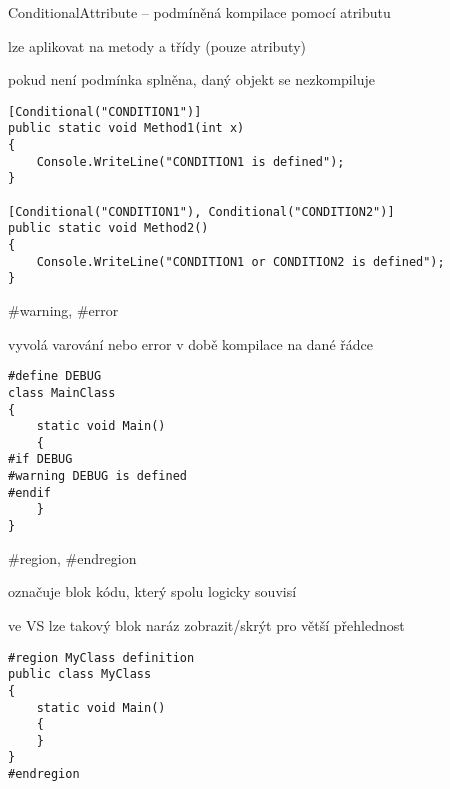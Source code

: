 \begin{frame}[fragile]
\vfill
\begin{bitemize}{ConditionalAttribute -- podmíněná kompilace pomocí atributu}
\item lze aplikovat na metody a třídy (pouze atributy)
\item pokud není podmínka splněna, daný objekt se nezkompiluje
\end{bitemize}
\vfill
\begin{yesblock}
\begin{lstlisting}
[Conditional("CONDITION1")]
public static void Method1(int x)
{
    Console.WriteLine("CONDITION1 is defined");
}

[Conditional("CONDITION1"), Conditional("CONDITION2")]  
public static void Method2()
{
    Console.WriteLine("CONDITION1 or CONDITION2 is defined");
}
\end{lstlisting}
\end{yesblock}
\vfill
\end{frame}



\begin{frame}[fragile]
\vfill
\begin{bitemize}{\#warning, \#error}
\item vyvolá varování nebo error v době kompilace na dané řádce
\end{bitemize}
\vfill
\begin{yesblock}
\begin{lstlisting}
#define DEBUG  
class MainClass   
{  
    static void Main()   
    {  
#if DEBUG  
#warning DEBUG is defined  
#endif  
    }  
}  
\end{lstlisting}
\end{yesblock}
\vfill
\end{frame}


\begin{frame}[fragile]
\vfill
\begin{bitemize}{\#region, \#endregion}
\item označuje blok kódu, který spolu logicky souvisí
\item ve VS lze takový blok naráz zobrazit/skrýt pro větší přehlednost
\end{bitemize}
\vfill
\begin{yesblock}
\begin{lstlisting}
#region MyClass definition  
public class MyClass   
{  
    static void Main()   
    {  
    }  
}  
#endregion  
\end{lstlisting}
\end{yesblock}
\vfill
\end{frame}

